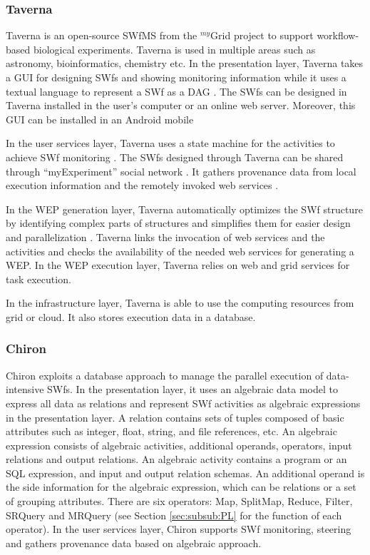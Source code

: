 \subsubsection{Taverna}
Taverna \cite{Missier2010} is an open-source SWfMS from the
$^{my}$Grid project to 
support workflow-based biological experiments.
Taverna is used in multiple areas such as astronomy, bioinformatics, chemistry etc. 
In the presentation layer, Taverna takes a GUI
for designing SWfs and 
showing monitoring information while it uses a textual language to represent a 
SWf as a DAG \cite{Yu2005}. 
The SWfs can be designed in Taverna installed in the user's computer or an online web server.
Moreover, this GUI can be installed in an Android mobile \cite{Zhang2013} 

In the user services layer, Taverna uses a state machine for the activities to achieve SWf monitoring \cite{Oinn2004}.
The SWfs designed through Taverna can be shared through \textquotedblleft{}myExperiment\textquotedblright{} social network \cite{Wolstencroft2013}.
It gathers provenance data from local execution information and the remotely invoked web services \cite{Oinn2007}. 

In the WEP generation layer, Taverna automatically optimizes the SWf structure by identifying complex 
parts of structures and simplifies them for easier design and parallelization \cite{Cohen-Boulakia2014}. 
Taverna links the invocation of web services and the 
activities and checks the availability of the needed web services for generating a WEP.
In the WEP execution layer, Taverna relies on web and grid services for task execution. 

In the infrastructure layer, Taverna is able to use the computing resources from grid or cloud. It also stores execution data in a database.

\subsubsection{Chiron}
Chiron exploits a database approach \cite{Ozsu2011} to manage the parallel execution of data-intensive SWfs. 
In the presentation layer, it uses an algebraic data model to express all data as relations and represent SWf activities as algebraic expressions in the presentation layer. 
A relation contains sets of tuples composed of basic attributes such
as integer, float, string, and file references, etc.
An algebraic expression consists of algebraic
activities, additional operands, operators, input relations and output relations.
An algebraic activity contains a program or an SQL expression, and input
and output relation schemas. 
An additional operand is the side information for the algebraic expression, which can be relations
or a set of grouping attributes.
There are six operators:
Map, SplitMap, Reduce, Filter, SRQuery and MRQuery (see Section
\ref{sec:subsub:PL} for the function of each operator). 
In the user services layer, Chiron supports SWf monitoring, steering and gathers provenance data based on algebraic approach. 

